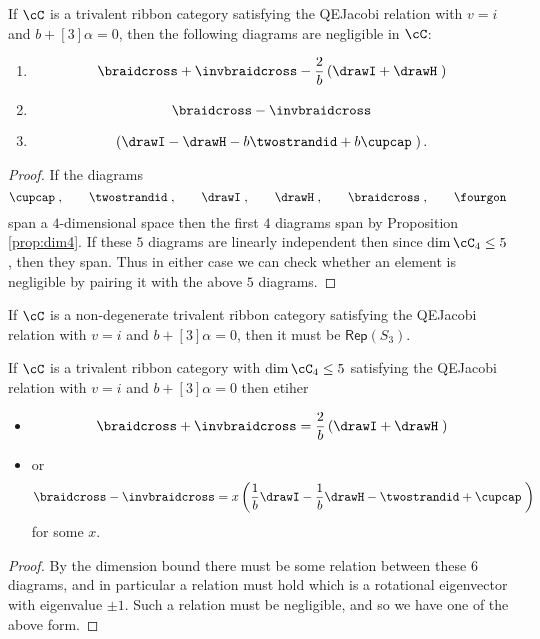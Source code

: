 \documentclass[12pt]{amsart}
\begin{document}
\begin{lemma}
If $\cC$ is a trivalent ribbon category satisfying the QEJacobi relation with $v=i$ and $b+[3]\alpha = 0$, then the following diagrams are negligible in $\cC$:
\begin{enumerate}
\item $$\braidcross + \invbraidcross - \frac{2}{b} \left(\drawI + \drawH \;\right)$$
\item $$\braidcross - \invbraidcross$$
\item $$\left(\drawI - \drawH - b \twostrandid + b \cupcap\;\right).$$
\end{enumerate}
\end{lemma}
\begin{proof}
If the diagrams
  \[
  \cupcap\;,\qquad\twostrandid\;,
    \qquad\drawI\;,\qquad\drawH\;,\qquad\braidcross\;,\qquad\fourgon\;
   \]
 span a $4$-dimensional space then the first $4$ diagrams span by Proposition \ref{prop:dim4}.  If these $5$ diagrams are linearly independent then since $\dim \cC_4 \leq 5$, then they span.  Thus in either case we can check whether an element is negligible by pairing it with the above $5$ diagrams.
\end{proof}

\begin{corollary}
If $\cC$ is a non-degenerate trivalent ribbon category satisfying the QEJacobi relation with $v=i$ and $b+[3]\alpha = 0$, then it must be $\mathsf{Rep}(S_3)$.
\end{corollary}

\begin{corollary}
If $\cC$ is a trivalent ribbon category with $\dim \cC_4 \leq 5$ satisfying the QEJacobi relation with $v=i$ and $b+[3]\alpha = 0$ then etiher
\begin{itemize}
\item $$\braidcross + \invbraidcross = \frac{2}{b} \left(\drawI + \drawH \;\right)$$ 
\item or $$\braidcross - \invbraidcross = x \left(\frac{1}{b} \drawI - \frac{1}{b} \drawH - \twostrandid + \cupcap\;\right)$$ for some $x$.
\end{itemize}
\end{corollary}
\begin{proof}
By the dimension bound there must be some relation between these $6$ diagrams, and in particular a relation must hold which is a rotational eigenvector with eigenvalue $\pm 1$.  Such a relation must be negligible, and so we have one of the above form.
\end{proof}
\end{document}
